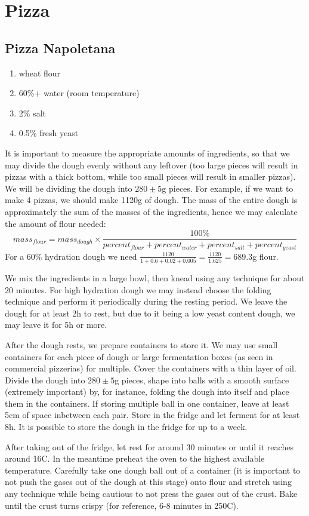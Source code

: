 \chapter{Pizza}
\section{Pizza Napoletana}

\begin{enumerate}
  \item wheat flour
  \item 60\%+ water (room temperature)
  \item 2\% salt
  \item 0.5\% fresh yeast
\end{enumerate}

It is important to measure the appropriate amounts of ingredients, so that we
may divide the dough evenly without any leftover (too large pieces will result
in pizzas with a thick bottom, while too small pieces will result in smaller
pizzas). We will be dividing the dough into $280 \pm 5$g pieces. For example,
if we want to make 4 pizzas, we should make 1120g of dough. The mass of the
  entire dough is approximately the sum of the masses of the ingredients, hence
  we may calculate the amount of flour needed:
$$
mass_{flour} = mass_{dough} \times \frac{100\%}{ percent_{flour} + percent_{water} + percent_{salt} + percent_{yeast} }
$$
For a 60\% hydration dough we need $\frac{1120}{1 + 0.6 + 0.02 + 0.005} =
\frac{1120}{1.625} = 689.3$g flour.

We mix the ingredients in a large bowl, then knead using any technique for
about 20 minutes. For high hydration dough we may instead choose the folding
technique and perform it periodically during the resting period. We leave the
dough for at least 2h to rest, but due to it being a low yeast content dough,
we may leave it for 5h or more.

After the dough rests, we prepare containers to store it. We may use small
containers for each piece of dough or large fermentation boxes (as seen in
commercial pizzerias) for multiple. Cover the containers with a thin layer of
oil. Divide the dough into $280 \pm 5$g pieces, shape into balls with a smooth
surface (extremely important) by, for instance, folding the dough into itself
and place them in the containers. If storing multiple ball in one container,
leave at least 5cm of space inbetween each pair. Store in the fridge and let
ferment for at least 8h. It is possible to store the dough in the fridge for up
to a week.

After taking out of the fridge, let rest for around 30 minutes or until it
reaches around 16C. In the meantime preheat the oven to the highest available
temperature. Carefully take one dough ball out of a container (it is important
to not push the gases out of the dough at this stage) onto flour and stretch
using any technique while being cautious to not press the gases out of the
crust. Bake until the crust turns crispy (for reference, 6-8 minutes in 250C).
